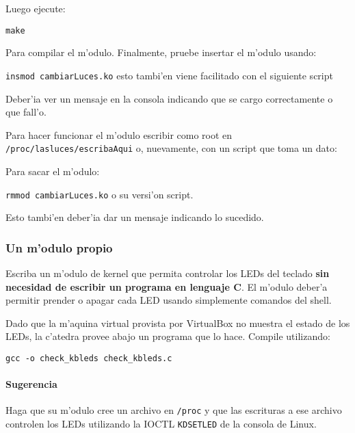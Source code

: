
Luego ejecute:

\texttt{make}

Para compilar el m'odulo. Finalmente, pruebe insertar el m'odulo usando:

\texttt{insmod cambiarLuces.ko} esto tambi'en viene facilitado con el siguiente script

Deber'ia ver un mensaje en la consola indicando que se cargo correctamente o que fall'o. 

Para hacer funcionar el m'odulo escribir como root en \texttt{/proc/lasluces/escribaAqui} o, nuevamente, con un script que toma un dato:


Para sacar el m'odulo:

\texttt{rmmod cambiarLuces.ko} o su versi'on script.


Esto tambi'en deber'ia dar un mensaje indicando lo sucedido.

\subsubsection{Un m'odulo propio}

Escriba un m'odulo de kernel que permita controlar los LEDs del teclado \textbf{sin necesidad de escribir un programa 
en lenguaje C}. El m'odulo deber'a permitir prender o apagar cada LED usando simplemente comandos del shell.

Dado que la m'aquina virtual provista por VirtualBox no muestra el estado de los LEDs, la c'atedra provee abajo
un programa que lo hace. Compile utilizando:

\texttt{gcc -o check\_kbleds check\_kbleds.c}


\paragraph{Sugerencia}

Haga que su m'odulo cree un archivo en \texttt{/proc} y que las escrituras a ese archivo controlen los LEDs utilizando 
la IOCTL \texttt{KDSETLED} de la consola de Linux.
